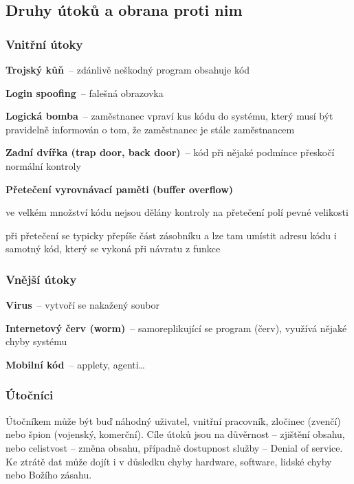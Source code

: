 \subsection{Druhy útoků a obrana proti nim}

\subsubsection*{Vnitřní útoky}
\begin{pitemize}
  \item \textbf{Trojský kůň}~-- zdánlivě neškodný program obsahuje  kód
  \item \textbf{Login spoofing}~-- falešná  obrazovka
  \item \textbf{Logická bomba}~-- zaměstnanec vpraví kus kódu do systému, který
  musí být pravidelně informován o tom, že zaměstnanec je stále zaměstnancem
  \item \textbf{Zadní dvířka (trap door, back door)}~-- kód při nějaké podmínce
  přeskočí normální kontroly
  \item \textbf{Přetečení vyrovnávací paměti (buffer overflow)}
  \begin{pitemize}
    \item ve velkém množství kódu nejsou dělány kontroly na přetečení polí pevné velikosti
    \item při přetečení se typicky přepíše část zásobníku a lze tam umístit adresu kódu i samotný kód, který se vykoná při návratu z funkce
  \end{pitemize}
\end{pitemize}

\subsubsection*{Vnější útoky}
\begin{pitemize}
  \item \textbf{Virus}~-- vytvoří se nakažený  soubor
  \item \textbf{Internetový červ (worm)}~-- samoreplikující se program (červ),
  využívá nějaké chyby systému 
  \item \textbf{Mobilní kód}~-- applety, agenti\dots
\end{pitemize}

\subsubsection*{Útočníci}
Útočníkem může být buď náhodný uživatel, vnitřní pracovník, zločinec (zvenčí) nebo špion (vojenský, komerční). Cíle útoků jsou na důvěrnost -- zjištění obsahu, nebo celistvost -- změna obsahu, případně dostupnost služby -- Denial of service. Ke ztrátě dat může dojít i v důsledku chyby hardware, software, lidské chyby nebo Božího zásahu.

